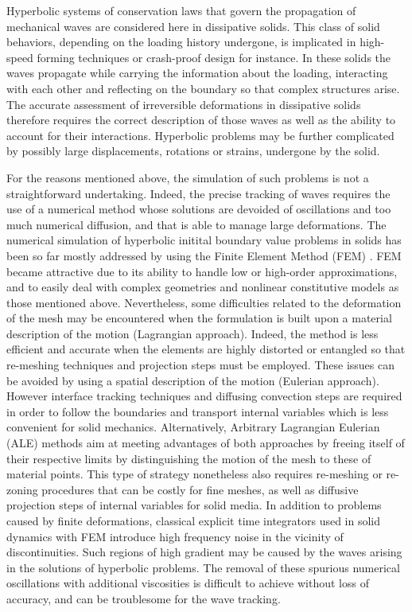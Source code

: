 Hyperbolic systems of conservation laws that govern the propagation of mechanical waves are considered here in dissipative solids.
This class of solid behaviors, depending on the loading history undergone, is implicated in high-speed forming techniques or crash-proof design for instance.
In these solids the waves propagate while carrying the information about the loading, interacting with each other and reflecting on the boundary so that complex structures arise.
The accurate assessment of irreversible deformations in dissipative solids therefore requires the correct description of those waves as well as the ability to account for their interactions.
Hyperbolic problems may be further complicated by possibly large displacements, rotations or strains, undergone by the solid.

For the reasons mentioned above, the simulation of such problems is not a straightforward undertaking.
Indeed, the precise tracking of waves requires the use of a numerical method whose solutions are devoided of oscillations and too much numerical diffusion, and that is able to manage large deformations.
The numerical simulation of hyperbolic initital boundary value problems in solids has been so far mostly addressed by using the Finite Element Method (FEM) \cite{Belytschko}.
FEM became attractive due to its ability to handle low or high-order approximations, and to easily deal with complex geometries and nonlinear constitutive models as those mentioned above.
Nevertheless, some difficulties related to the deformation of the mesh may be encountered when the formulation is built upon a material description of the motion (Lagrangian approach). 
Indeed, the method is less efficient and accurate when the elements are highly distorted or entangled so that re-meshing techniques and projection steps must be employed.
These issues can be avoided by using a spatial description of the motion (Eulerian approach).
However interface tracking techniques and diffusing convection steps are required in order to follow the boundaries and transport internal variables which is less convenient for solid mechanics.
Alternatively, Arbitrary Lagrangian Eulerian (ALE) methods aim at meeting advantages of both approaches by freeing itself of their respective limits by distinguishing the motion of the mesh to these of material points.
This type of strategy nonetheless also requires re-meshing or re-zoning procedures that can be costly for fine meshes, as well as diffusive projection steps of internal variables for solid media.
In addition to problems caused by finite deformations, classical explicit time integrators used in solid dynamics with FEM introduce high frequency noise in the vicinity of discontinuities.
Such regions of high gradient may be caused by the waves arising in the solutions of hyperbolic problems.
The removal of these spurious numerical oscillations with additional viscosities is difficult to achieve without loss of accuracy, and can be troublesome for the wave tracking.

